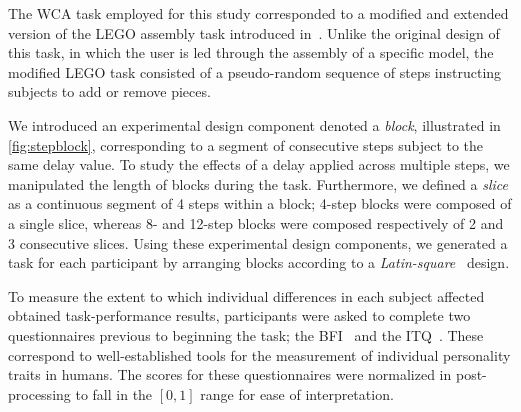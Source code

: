 \medskip
The \gls{WCA} task employed for this study corresponded to a modified and extended version of the LEGO assembly task introduced in~\cite{chen2015early}.
Unlike the original design of this task, in which the user is led through the assembly of a specific model, the modified LEGO task consisted of a pseudo-random sequence of steps instructing subjects to add or remove pieces.

We introduced an experimental design component denoted a \emph{block}, illustrated in \cref{fig:stepblock}, corresponding to a segment of consecutive steps subject to the same delay value.
To study the effects of a delay applied across multiple steps, we manipulated the length of blocks during the task. %
Furthermore, we defined a \emph{slice} as a continuous segment of \num{4} steps within a block;
\num{4}-step blocks were composed of a single slice, whereas \num{8}- and \num{12}-step blocks were composed respectively of \num{2} and \num{3} consecutive slices.
Using these experimental design components, we generated a task for each participant by arranging blocks according to a \emph{Latin-square}~\cite{keedwell2015latin} design.

To measure the extent to which individual differences in each subject affected obtained task-performance results, participants were asked to complete two questionnaires previous to beginning the task;
the \gls{BFI}~\cite{john1999big} and the \gls{ITQ}~\cite{witmer1998measuring}.
These correspond to well-established tools for the measurement of individual personality traits in humans.
The scores for these questionnaires were normalized in post-processing to fall in the \ensuremath{[0, 1]} range for ease of interpretation.

